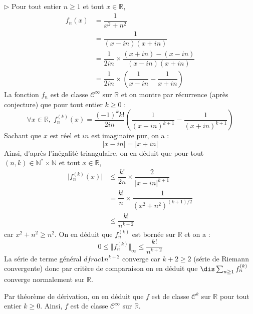\documentclass[a4paper,10pt]{report}
\begin{document}
\medskip

\noindent $\rhd$ Pour tout entier $n \geq 1$ et tout $x \in \mathbb{R}$,
\begin{align*}
f_n(x) & = \dfrac{1}{x^2+n^2} \\
& = \dfrac{1}{(x-in)(x+in)} \\
& = \dfrac{1}{2in} \times \dfrac{(x+in)-(x-in)}{(x-in)(x+in)} \\
& = \dfrac{1}{2in} \times \left( \dfrac{1}{x-in} - \dfrac{1}{x+in} \right)
\end{align*}
La fonction $f_n$ est de classe $\mathcal{C}^{\infty}$ sur $\mathbb{R}$ et on montre par récurrence (après conjecture) que pour tout entier $k \geq 0$ :
$$ \forall x \in \mathbb{R}, \; f_n^{(k)}(x) = \dfrac{(-1)^k k!}{2in} \left( \dfrac{1}{(x-in)^{k+1}} - \dfrac{1}{(x+in)^{k+1}} \right) $$
Sachant que $x$ est réel et $in$ est imaginaire pur, on a :
$$ \vert x-in \vert = \vert x+in \vert$$
Ainsi, d'après l'inégalité triangulaire, on en déduit que pour tout $(n,k) \in \mathbb{N}^* \times \mathbb{N}$ et tout $x \in \mathbb{R}$,
\begin{align*}
\vert  f_n^{(k)}(x) \vert & \leq \dfrac{k!}{2n} \times \dfrac{2}{\vert x-in \vert^{k+1}} \\
& = \dfrac{k!}{n} \times \dfrac{1}{(x^2+n^2)^{(k+1)/2}} \\
& \leq \dfrac{k!}{n^{k+2}}  
\end{align*}
car $x^2+n^2 \geq n^2$. On en déduit que $f_n^{(k)}$ est bornée sur $\mathbb{R}$ et on a :
$$ 0 \leq \Vert f_n^{(k)} \Vert_{\infty} \leq \dfrac{k!}{n^{k+2}} $$
La série de terme général $dfrac{1}{n^{k+2}}$ converge car $k+2 \geq 2$ (série de Riemann convergente) donc par critère de comparaison on en déduit que $\dis \sum_{n \geq 1} f_n^{(k)}$ converge normalement sur $\mathbb{R}$.

\medskip

\noindent Par théorème de dérivation, on en déduit que $f$ est de classe $\mathcal{C}^k$ sur $\mathbb{R}$ pour tout entier $k \geq 0$. Ainsi, $f$ est de classe $\mathcal{C}^{\infty}$ sur $\mathbb{R}$.
\end{document}
